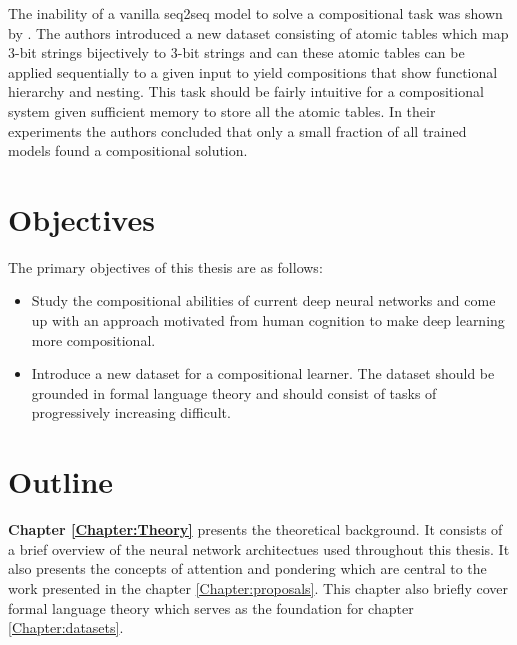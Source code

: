 The inability of a vanilla seq2seq model to solve a compositional task was shown by \cite{Liska2018}. The authors introduced a new dataset consisting of atomic tables which map 3-bit strings bijectively to 3-bit strings and can these atomic tables can be applied sequentially to a given input to yield compositions that show functional hierarchy and nesting. This task should be fairly intuitive for a compositional system given sufficient memory to store all the atomic tables. In their experiments the authors concluded that only a small fraction of all trained models found a compositional solution.


		
\section{Objectives}
	The primary objectives of this thesis are as follows:
	\begin{itemize}
		\item Study the compositional abilities of current deep neural networks and come up with an approach motivated from human cognition to make deep learning more compositional.
		\item Introduce a new dataset for a compositional learner. The dataset should be grounded in formal language theory and should consist of tasks of progressively increasing difficult.
	\end{itemize}

	
\section{Outline}
	\textbf{Chapter \ref{Chapter:Theory}} presents the theoretical background. It consists of a brief overview of the neural network architectues used throughout this thesis. It also presents the concepts of attention and pondering which are central to the work presented in the chapter \ref{Chapter:proposals}. This chapter also briefly cover formal language theory which serves as the foundation for chapter \ref{Chapter:datasets}.
	
